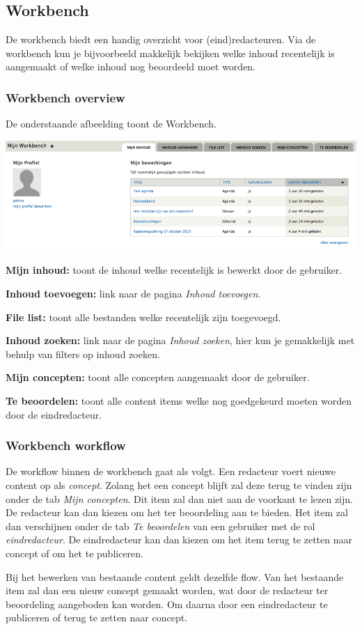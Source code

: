 \subsection{Workbench}\label{workbench}
De workbench biedt een handig overzicht voor (eind)redacteuren. Via de workbench kun je bijvoorbeeld makkelijk bekijken welke inhoud recentelijk is aangemaakt of welke inhoud nog beoordeeld moet worden.

\subsubsection{Workbench overview}\label{workbenchoverview}
De onderstaande afbeelding toont de Workbench. 
\bigskip

\begin{center}
	\includegraphics[width=\textwidth]{img/workbench.png}
\end{center}

\textbf{Mijn inhoud:} toont de inhoud welke recentelijk is bewerkt door de gebruiker.

\textbf{Inhoud toevoegen:} link naar de pagina \emph{Inhoud toevoegen}.

\textbf{File list:} toont alle bestanden welke recentelijk zijn toegevoegd.

\textbf{Inhoud zoeken:} link naar de pagina \emph{Inhoud zoeken}, hier kun je gemakkelijk met behulp van filters op inhoud zoeken.

\textbf{Mijn concepten:} toont alle concepten aangemaakt door de gebruiker.

\textbf{Te beoordelen:} toont alle content items welke nog goedgekeurd moeten worden door de eindredacteur.

\subsubsection{Workbench workflow}\label{workbenchworkflow}

De workflow binnen de workbench gaat als volgt. Een redacteur voert nieuwe content op als \emph{concept}. Zolang het een concept blijft zal deze terug te vinden zijn onder de tab \emph{Mijn concepten}. Dit item zal dan niet aan de voorkant te lezen zijn. De redacteur kan dan kiezen om het ter beoordeling aan te bieden. Het item zal dan verschijnen onder de tab \emph{Te beoordelen} van een gebruiker met de rol \emph{eindredacteur}. De eindredacteur kan dan kiezen om het item terug te zetten naar concept of om het te publiceren. 

Bij het bewerken van bestaande content geldt dezelfde flow. Van het bestaande item zal dan een nieuw concept gemaakt worden, wat door de redacteur ter beoordeling aangeboden kan worden. Om daarna door een eindredacteur te publiceren of terug te zetten naar concept.